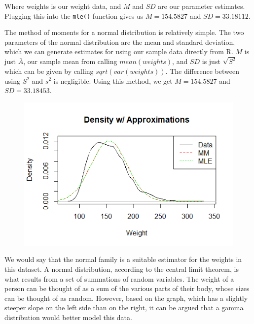 \documentclass[12pt, a4paper, oneside]{report}
\begin{document}
Where weights is our weight data, and \(M\) and \(SD\) are our parameter estimates. Plugging this into the \lstinline{mle()} function gives us \(M = 154.5827\) and \(SD = 33.18112\).

The method of moments for a normal distribution is relatively simple. The two parameters of the normal distribution are the mean and standard deviation, which we can generate estimates for using our sample data directly from R. \(M\) is just \(\bar{A}\), our sample mean from calling \(mean(weights)\), and \(SD\) is just \(\sqrt{S^2}\) which can be given by calling \(sqrt(var(weights))\). The difference between using \(S^2\) and \(s^2\) is negligible. Using this method, we get \(M = 154.5827\) and \(SD = 33.18453\).

\begin{figure}[h]
  \centering
  \includegraphics[width=\linewidth]{normDensityA.png}
\end{figure}

\newpage
We would say that the normal family is a suitable estimator for the weights in this dataset. A normal distribution, according to the central limit theorem, is what results from a set of summations of random variables. The weight of a person can be thought of as a sum of the various parts of their body, whose sizes can be thought of as random. 
However, based on the graph, which has a slightly steeper slope on the left side than on the right, it can be argued that a gamma distribution would better model this data. 
\end{document}
